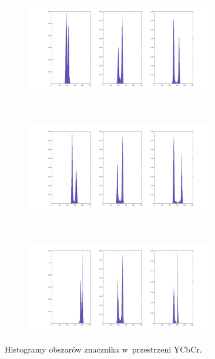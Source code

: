 \begin{figure}
	\centering
	\begin{subfigure}{\textwidth}
		\centering
		\includegraphics[width=0.9\textwidth]{ycbcr_hist1.jpg}
		\caption{}
		\label{fig:ycbcr_hist1}
	\end{subfigure}\\
	\begin{subfigure}{\textwidth}
		\centering
		\includegraphics[width=0.9\textwidth]{ycbcr_hist2.jpg}
		\caption{}
		\label{fig:ycbcr_hist2}
	\end{subfigure}\\
	\begin{subfigure}{\textwidth}
		\centering
		\includegraphics[width=0.9\textwidth]{ycbcr_hist3.jpg}
		\caption{}
		\label{fig:ycbcr_hist3}
	\end{subfigure}
	\caption{Histogramy obszarów znacznika w~przestrzeni YCbCr.}
	\label{fig:histogramy_ycbcr}
\end{figure}
